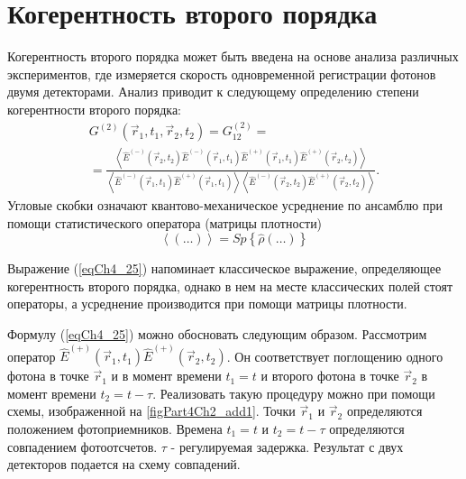 \section{Когерентность второго порядка}
Когерентность второго порядка может быть введена на основе анализа
различных экспериментов, где измеряется скорость одновременной
регистрации фотонов двумя детекторами. Анализ приводит к
следующему определению степени когерентности второго порядка: 
\begin{eqnarray}
G^{(2)}\left(\vec{r}_1, t_1, \vec{r}_2, t_2\right) = 
G^{(2)}_{12} = 
\nonumber \\
=
\frac{\left<
\hat{E}^{(-)}\left(\vec{r}_2, t_2\right)
\hat{E}^{(-)}\left(\vec{r}_1, t_1\right)
\hat{E}^{(+)}\left(\vec{r}_1, t_1\right)
\hat{E}^{(+)}\left(\vec{r}_2, t_2\right)
\right>}
{\left<
\hat{E}^{(-)}\left(\vec{r}_1, t_1\right)
\hat{E}^{(+)}\left(\vec{r}_1, t_1\right)
\right>
\left<
\hat{E}^{(-)}\left(\vec{r}_2, t_2\right)
\hat{E}^{(+)}\left(\vec{r}_2, t_2\right)
\right>
}.
\label{eqCh4_25}
\end{eqnarray}
Угловые скобки означают квантово-механическое усреднение по ансамблю
при помощи статистического оператора (матрицы плотности) 
\[
\left<\left(\dots\right)\right> = Sp\left\{\hat{\rho}\left(\dots\right)\right\}
\]

Выражение (\ref{eqCh4_25}) напоминает классическое выражение,
определяющее когерентность второго порядка, однако в нем на месте
классических полей стоят операторы, а усреднение производится при
помощи матрицы плотности. 



Формулу (\ref{eqCh4_25}) можно обосновать следующим
образом. Рассмотрим оператор 
$\hat{E}^{(+)}\left(\vec{r}_1, t_1\right)\hat{E}^{(+)}\left(\vec{r}_2,
t_2\right)$. Он соответствует поглощению одного фотона в точке
$\vec{r}_1$ и в момент времени $t_1 = t$ и второго фотона в точке
$\vec{r}_2$ в момент времени $t_2 = t - \tau$. Реализовать такую
процедуру можно при помощи схемы, изображенной на
\autoref{figPart4Ch2_add1}. Точки  $\vec{r}_1$ и $\vec{r}_2$
определяются положением фотоприемников. Времена $t_1 = t$ и $t_2 = t -
\tau$ определяются совпадением фотоотсчетов. $\tau$ - регулируемая
задержка. Результат с двух детекторов подается на схему совпадений. 

